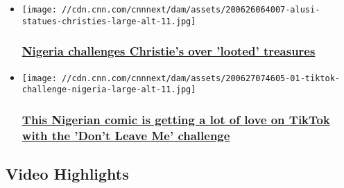 \begin{itemize}
\item
  \href{/style/article/christies-nigeria-artifacts/index.html}{}

  \texttt{[image: //cdn.cnn.com/cnnnext/dam/assets/200626064007-alusi-statues-christies-large-alt-11.jpg]}

  \hypertarget{nigeria-challenges-christies-over-looted-treasures}{%
  \subsubsection{\texorpdfstring{\href{/style/article/christies-nigeria-artifacts/index.html}{Nigeria
  challenges Christie's over 'looted'
  treasures}}{Nigeria challenges Christie's over 'looted' treasures}}\label{nigeria-challenges-christies-over-looted-treasures}}
\end{itemize}

\begin{itemize}
\item
  \href{/2020/06/27/africa/tiktok-challenge-nigeria/index.html}{}

  \texttt{[image: //cdn.cnn.com/cnnnext/dam/assets/200627074605-01-tiktok-challenge-nigeria-large-alt-11.jpg]}

  \hypertarget{this-nigerian-comic-is-getting-a-lot-of-love-on-tiktok-with-the-dont-leave-me-challenge}{%
  \subsubsection{\texorpdfstring{\href{/2020/06/27/africa/tiktok-challenge-nigeria/index.html}{This
  Nigerian comic is getting a lot of love on TikTok with the 'Don't
  Leave Me'
  challenge}}{This Nigerian comic is getting a lot of love on TikTok with the 'Don't Leave Me' challenge}}\label{this-nigerian-comic-is-getting-a-lot-of-love-on-tiktok-with-the-dont-leave-me-challenge}}
\end{itemize}

\hypertarget{video-highlights-}{%
\subsection{Video Highlights~}\label{video-highlights-}}

